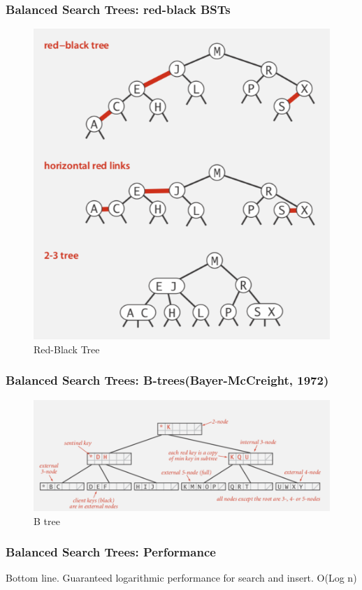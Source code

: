\documentclass[11pt]{beamer}
\begin{document}
\begin{frame}
	\frametitle{Balanced Search Trees:  red-black BSTs }
	\begin{figure}
		\centering
		\includegraphics[width=0.6\linewidth]{"Screenshot 2020-11-24 at 6.20.09 PM"}
		\caption{Red-Black Tree}
		\label{fig:screenshot-2020-11-24-at-6}
	\end{figure}
	
\end{frame}	
\begin{frame}
	\frametitle{Balanced Search Trees:  B-trees(Bayer-McCreight, 1972)}
	\begin{figure}
		\centering
		\includegraphics[width=1.05\linewidth]{"Screenshot 2020-11-24 at 6.22.16 PM"}
		\caption{B tree}
		\label{fig:screenshot-2020-11-24-at-6}
	\end{figure}
\end{frame}	

\begin{frame}
	\frametitle{Balanced Search Trees:  Performance}
	\alert{Bottom line. Guaranteed logarithmic performance for search and insert. O(Log n)}
\end{frame}		
\end{document}

